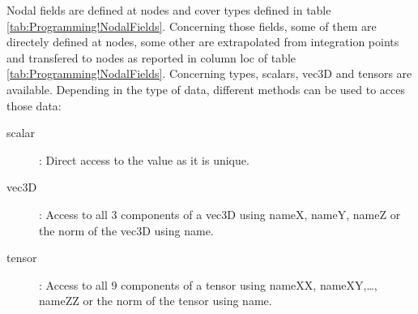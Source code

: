 Nodal fields are defined at nodes and cover types defined in table \ref{tab:Programming!NodalFields}. Concerning those fields, some of them are directely defined at nodes, some other are extrapolated from integration points and transfered to nodes as reported in column \textsf{loc} of table \ref{tab:Programming!NodalFields}. Concerning types, \textsf{scalars}, \textsf{vec3D} and \textsf{tensors} are available. Depending in the type of data, different methods can be used to acces those data:
\begin{description}
	\item [{scalar}] : Direct access to the value as it is unique.
	\item [{vec3D}] : Access to all $3$ components of a vec3D using \textsf{nameX}, \textsf{nameY}, \textsf{nameZ} or the norm of the vec3D using \textsf{name}.
	\item [{tensor}] : Access to all $9$ components of a tensor using \textsf{nameXX}, \textsf{nameXY},\ldots, \textsf{nameZZ} or the norm of the tensor using \textsf{name}.
\end{description}
